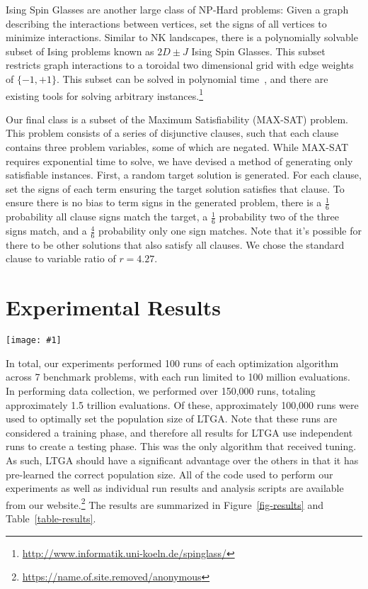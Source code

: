 \documentclass{sig-alternate}
\newcommand{\includegraphicswide}[1]
{\texttt{[image: \#1]}}
\begin{document}
Ising Spin Glasses are another large class of NP-Hard problems: Given a graph
describing the interactions between vertices, set the signs of all vertices to minimize
interactions.
Similar to NK landscapes, there is a polynomially solvable subset of Ising problems
known as $2D\pm J$ Ising Spin Glasses.  This subset restricts graph interactions to a
toroidal two dimensional grid with edge weights of $\{-1, +1\}$.  This subset can
be solved in polynomial time~\cite{saul:1994:spinglass}, and there are existing
tools for solving arbitrary instances.\footnote{\url{http://www.informatik.uni-koeln.de/spinglass/}}

Our final class is a subset of the Maximum Satisfiability (MAX-SAT) problem.
This problem consists of a series of disjunctive clauses, such that each clause contains
three problem variables, some of which are negated. While
MAX-SAT requires exponential time to solve, we have devised a method of generating
only satisfiable instances.
First, a random target solution is generated.  For each clause, set the signs of each
term ensuring the target solution satisfies that clause.
To ensure there is no bias to term signs in the generated problem, there is a $\frac{1}{6}$ probability
all clause signs match the target, a $\frac{1}{6}$ probability two of the three signs match,
and a $\frac{4}{6}$ probability only one sign matches.  Note that it's possible for there to be
other solutions that also satisfy all clauses.  We chose the standard clause to variable ratio
of $r=4.27$.

\section{Experimental Results}
\begin{figure*}
  \centering
  \includegraphicswide{WithRast}
  \caption{Comparison of the median number of evaluations to reach the global optimum for
           the four different optimization methods with respect
           to problem size.  If the median run did not reach the global optimum no data element
           is shown.  Results given on a log-log scale.}
  \label{fig-results}
\end{figure*}

In total, our experiments performed 100 runs of each optimization algorithm across
7 benchmark problems, with each run limited to 100 million evaluations.
In performing data collection, we performed over 150,000 runs, totaling approximately
1.5 trillion evaluations.  Of these, approximately 100,000 runs were used to optimally
set the population size of LTGA.  Note that these runs are considered a training phase,
and therefore all results for LTGA use independent runs to create a testing phase.
This was the only algorithm that received tuning.  As such, LTGA should have a significant
advantage over the others in that it has pre-learned the correct population size.
All of the code used to perform our experiments
as well as individual run results and analysis scripts are available from our
website.\footnote{\url{https://name.of.site.removed/anonymous}}  The results
are summarized in Figure~\ref{fig-results} and Table~\ref{table-results}.
\end{document}
